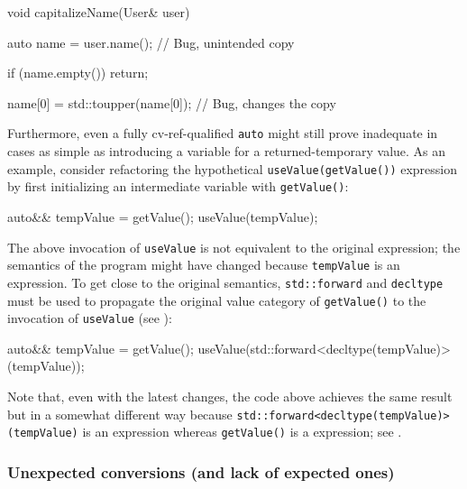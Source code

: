 \begin{emcppslisting}[language=C++]
void capitalizeName(User& user)
{
    auto name = user.name();  // Bug, unintended copy

    if (name.empty())
    {
         return;
    }

    name[0] = std::toupper(name[0]);  // Bug, changes the copy
}
\end{emcppslisting}
    
\noindent Furthermore, even a fully cv-ref-qualified \lstinline!auto! might still
prove inadequate in cases as simple as introducing a variable for a
returned-temporary value. As an example, consider refactoring the
hypothetical \lstinline!useValue(getValue())! expression by first
initializing an intermediate variable with \lstinline!getValue()!:

\begin{emcppslisting}[language=C++]
auto&& tempValue = getValue();
useValue(tempValue);
\end{emcppslisting}
    
\noindent The above invocation of \lstinline!useValue! is not equivalent to the
original expression; the semantics of the program might have changed because \lstinline!tempValue! is an  expression. To get
close to the original semantics, \lstinline!std::forward! and
\lstinline!decltype! must be used to propagate the original value category
of \lstinline!getValue()! to the invocation of \lstinline!useValue! (see
):

\begin{emcppslisting}[language=C++]
auto&& tempValue = getValue();
useValue(std::forward<decltype(tempValue)>(tempValue));
\end{emcppslisting}
    
\noindent Note that, even with the latest changes, the code above achieves the same result but in a somewhat different way because
 \lstinline!std::forward<decltype(tempValue)>(tempValue)! is
an  expression whereas \lstinline!getValue()! is a
 expression; see .

\subsubsection[Unexpected conversions (and lack of expected ones)]{Unexpected conversions (and lack of expected ones)}\label{unexpected-conversions-(and-lack-of-expected-ones)}

